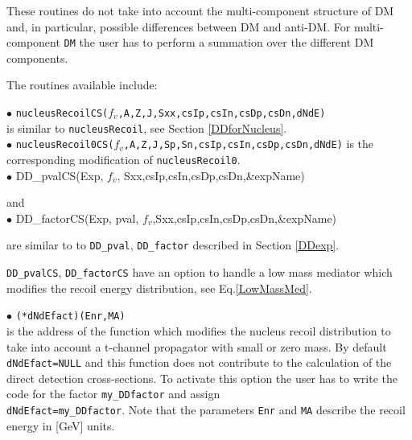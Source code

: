 \documentclass[12pt,a4paper]{article}
\begin{document}
These routines do not   take into account the multi-component structure of DM and, in particular, possible   
differences between DM and anti-DM.    For multi-component {\tt DM} the user has to perform a summation over the different DM components. 

The routines available include:
   
\noindent
$\bullet$ \verb|nucleusRecoilCS(|$f_v$\verb|,A,Z,J,Sxx,csIp,csIn,csDp,csDn,dNdE)|\\
is similar to \verb|nucleusRecoil|, see Section \ref{DDforNucleus}.  \\
\noindent
$\bullet$ \verb|nucleusRecoil0CS(|$f_v$\verb|,A,Z,J,Sp,Sn,csIp,csIn,csDp,csDn,dNdE)|
is the corresponding modification of \verb|nucleusRecoil0|.\\

\noindent
$\bullet$ DD\_pvalCS(Exp, $f_v$, Sxx,csIp,csIn,csDp,csDn,\&expName)

\noindent
and\\

\noindent
$\bullet$ DD\_factorCS(Exp, pval, $f_v$,Sxx,csIp,csIn,csDp,csDn,\&expName)

are similar to to  \verb|DD_pval|, \verb|DD_factor| described in Section \ref{DDexp}.

\verb|DD_pvalCS|, \verb|DD_factorCS|   have an option to handle  a low mass mediator which  modifies the recoil energy
distribution, see Eq.\ref{LowMassMed}.



\noindent
$\bullet$ \verb|(*dNdEfact)(Enr,MA)|\\
is the address of the function which modifies the nucleus recoil distribution to take into account a 
t-channel propagator  with  small or zero mass.  By default \verb|dNdEfact=NULL| and this 
function does not contribute to  the calculation of the direct detection cross-sections. To
activate this option the user has to write  the code for the factor  \verb|my_DDfactor| and assign\\
\verb|dNdEfact=my_DDfactor|.
Note that the  parameters {\tt Enr} and {\tt MA} describe the recoil energy in [GeV] units.
\end{document}
